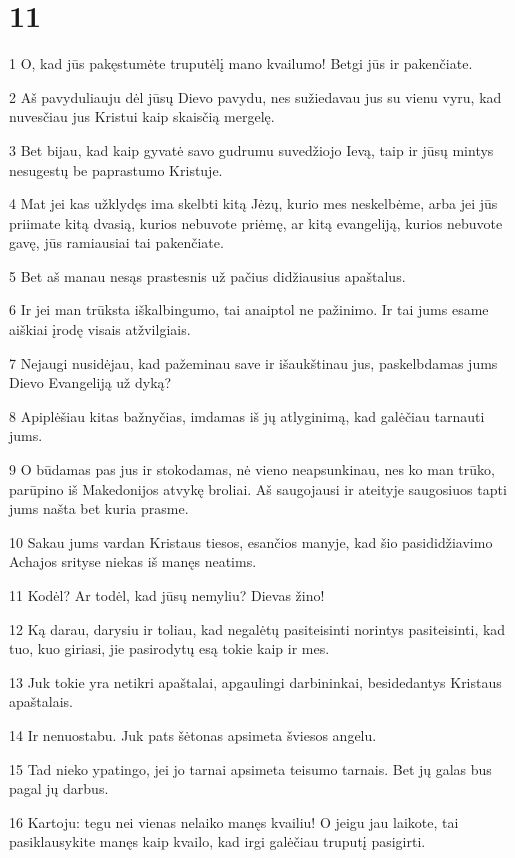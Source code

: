 \chapter{11}


\par 1 O, kad jūs pakęstumėte truputėlį mano kvailumo! Betgi jūs ir pakenčiate. 
\par 2 Aš pavyduliauju dėl jūsų Dievo pavydu, nes sužiedavau jus su vienu vyru, kad nuvesčiau jus Kristui kaip skaisčią mergelę. 
\par 3 Bet bijau, kad kaip gyvatė savo gudrumu suvedžiojo Ievą, taip ir jūsų mintys nesugestų be paprastumo Kristuje. 
\par 4 Mat jei kas užklydęs ima skelbti kitą Jėzų, kurio mes neskelbėme, arba jei jūs priimate kitą dvasią, kurios nebuvote priėmę, ar kitą evangeliją, kurios nebuvote gavę, jūs ramiausiai tai pakenčiate. 
\par 5 Bet aš manau nesąs prastesnis už pačius didžiausius apaštalus. 
\par 6 Ir jei man trūksta iškalbingumo, tai anaiptol ne pažinimo. Ir tai jums esame aiškiai įrodę visais atžvilgiais. 
\par 7 Nejaugi nusidėjau, kad pažeminau save ir išaukštinau jus, paskelbdamas jums Dievo Evangeliją už dyką? 
\par 8 Apiplėšiau kitas bažnyčias, imdamas iš jų atlyginimą, kad galėčiau tarnauti jums. 
\par 9 O būdamas pas jus ir stokodamas, nė vieno neapsunkinau, nes ko man trūko, parūpino iš Makedonijos atvykę broliai. Aš saugojausi ir ateityje saugosiuos tapti jums našta bet kuria prasme. 
\par 10 Sakau jums vardan Kristaus tiesos, esančios manyje, kad šio pasididžiavimo Achajos srityse niekas iš manęs neatims. 
\par 11 Kodėl? Ar todėl, kad jūsų nemyliu? Dievas žino! 
\par 12 Ką darau, darysiu ir toliau, kad negalėtų pasiteisinti norintys pasiteisinti, kad tuo, kuo giriasi, jie pasirodytų esą tokie kaip ir mes. 
\par 13 Juk tokie yra netikri apaštalai, apgaulingi darbininkai, besidedantys Kristaus apaštalais. 
\par 14 Ir nenuostabu. Juk pats šėtonas apsimeta šviesos angelu. 
\par 15 Tad nieko ypatingo, jei jo tarnai apsimeta teisumo tarnais. Bet jų galas bus pagal jų darbus. 
\par 16 Kartoju: tegu nei vienas nelaiko manęs kvailiu! O jeigu jau laikote, tai pasiklausykite manęs kaip kvailo, kad irgi galėčiau truputį pasigirti. 
